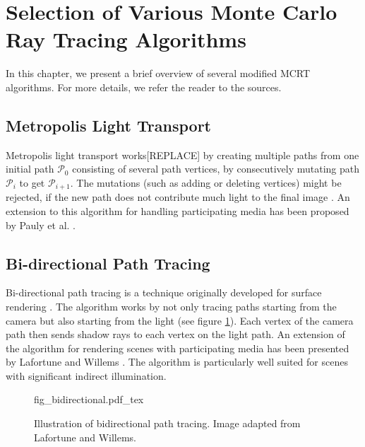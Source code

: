 \section{Selection of Various Monte Carlo Ray Tracing Algorithms}
\label{sec:mc_algorithms}
In this chapter, we present a brief overview of several modified MCRT algorithms. For more details, we refer the reader to the sources.
\subsection{Metropolis Light Transport}
Metropolis light transport\cite{metropolis} works[REPLACE] by creating multiple paths from one initial path $\mathcal{P}_0$ consisting of several path vertices, by consecutively mutating path $\mathcal{P}_i$ to get $\mathcal{P}_{i+1}$. The mutations (such as adding or deleting vertices) might be rejected, if the new path does not contribute much light to the final image \cite{metropolis}. An extension to this algorithm for handling participating media has been proposed by Pauly et al. \cite{10.1007/978-3-7091-6303-0_2}.
\subsection{Bi-directional Path Tracing}
Bi-directional path tracing is a technique originally developed for surface rendering \cite{bidirectional-ray-tracing}. The algorithm works by not only tracing paths starting from the camera but also starting from the light (see figure \ref{fig:bidirectional}). Each vertex of the camera path then sends shadow rays to each vertex on the light path. An extension of the algorithm for rendering scenes with participating media has been presented by Lafortune and Willems \cite{10.5555/275458.275468}. The algorithm is particularly well suited for scenes with significant indirect illumination.
\begin{figure}
\centering
\def\svgwidth{\columnwidth}
{fig_bidirectional.pdf_tex}

\caption{Illustration of bidirectional path tracing. Image adapted from Lafortune and Willems\cite{10.5555/275458.275468}.}
\label{fig:bidirectional}
\end{figure}
